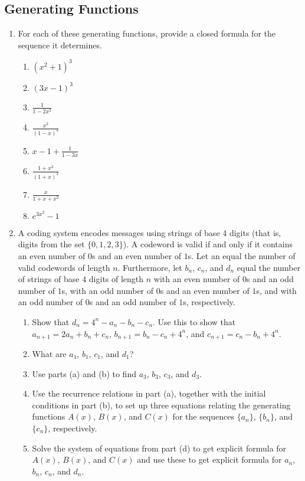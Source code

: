 \documentclass{sig-alternate-05-2015}
\begin{document}
\subsection{Generating Functions}
\begin{enumerate}
	\item For each of these generating functions, provide a closed
	formula for the sequence it determines.
	\begin{enumerate}
		\item $(x^2 + 1)^3$
		\item $(3x - 1)^3$
		\item $\frac{1}{1 - 2x^2} $
		\item $\frac{x^2}{(1 - x)^3}$
		\item $x - 1 + \frac{1}{1 - 3x}$
		\item $\frac{1 + x^3}{(1 + x)^3}$
		\item $\frac{x}{1 + x + x^2}$
		\item $e^{3x^2} - 1$
	\end{enumerate}
	
	\item A coding system encodes messages using strings of
	base 4 digits (that is, digits from the set $\{0, 1, 2, 3\}$). A codeword is valid if and only if it contains an even
	number of $0$s and an even number of $1$s. Let an equal the number of valid codewords of length $n$. Furthermore, let $b_n$, $c_n$, and $d_n$ equal the number of strings of base 4 digits of length $n$ with an even number of $0$s and an odd number of $1$s, with an odd number of $0$s and an even number of $1$s, and with an odd number of $0$s and an odd number of $1$s, respectively. \begin{enumerate}
		\item Show that $d_n = 4^n - a_n - b_n - c_n$. Use this to show that $a_{n+1} = 2a_n + b_n + c_n$, $b_{n+1} = b_n - c_n + 4^n$, and $c_{n+1} = c_n - b_n + 4^n$.
		\item What are $a_1$, $b_1$, $c_1$, and $d_1$?
		\item Use parts (a) and (b) to find $a_3$, $b_3$, $c_3$, and $d_3$.
		\item Use the recurrence relations in part (a), together with the initial conditions in part (b), to set up three equations relating the generating functions $A(x)$, $B(x)$, and $C(x)$ for the sequences $\{a_n\}$, $\{b_n\}$, and $\{c_n\}$, respectively.
		\item Solve the system of equations from part (d) to get explicit formula for $A(x)$, $B(x)$, and $C(x)$ and use these to get explicit formula for $a_n$, $b_n$, $c_n$, and $d_n$.
	\end{enumerate}
\end{enumerate}
\end{document}

